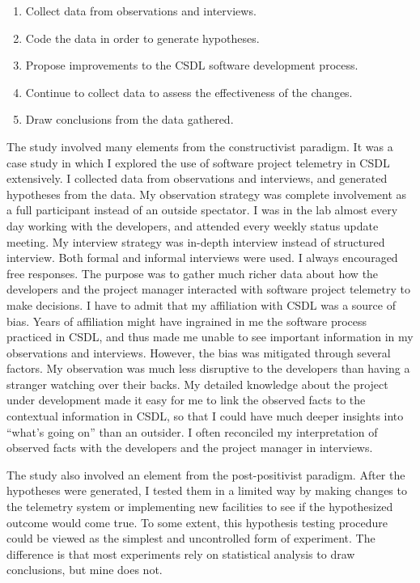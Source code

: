 \begin{enumerate}
  \setlength{\itemsep}{0pt}
  \setlength{\parskip}{0pt}
	\item Collect data from observations and interviews.
	\item Code the data in order to generate hypotheses.
  \item Propose improvements to the CSDL software development process.
  \item Continue to collect data to assess the effectiveness of the changes.
  \item Draw conclusions from the data gathered.
\end{enumerate}
  

The study involved many elements from the constructivist paradigm. It was a case study in which I explored the use of software project telemetry in CSDL extensively. I collected data from observations and interviews, and generated hypotheses from the data. My observation strategy was complete involvement as a full participant instead of an outside spectator. I was in the lab almost every day working with the developers, and attended every weekly status update meeting. My interview strategy was in-depth interview instead of structured interview. Both formal and informal interviews were used. I always encouraged free responses. The purpose was to gather much richer data about how the developers and the project manager interacted with software project telemetry to make decisions. I have to admit that my affiliation with CSDL was a source of bias. Years of affiliation might have ingrained in me the software process practiced in CSDL, and thus made me unable to see important information in my observations and interviews. However, the bias was mitigated through several factors. My observation was much less disruptive to the developers than having a stranger watching over their backs. My detailed knowledge about the project under development made it easy for me to link the observed facts to the contextual information in CSDL, so that I could have much deeper insights into ``what's going on'' than an outsider. I often reconciled my interpretation of observed facts with the developers and the project manager in interviews.

The study also involved an element from the post-positivist paradigm. After the hypotheses were generated, I tested them in a limited way by making changes to the telemetry system or implementing new facilities to see if the hypothesized outcome would come true. 
To some extent, this hypothesis testing procedure could be viewed as the simplest and uncontrolled form of experiment. The difference is that most experiments rely on statistical analysis to draw conclusions, but mine does not.


